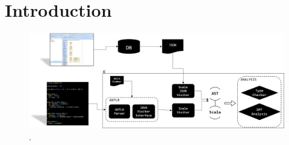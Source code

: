 \section{Introduction}

\begin{figure}
\centering
\includegraphics[scale=0.4]{K.png}
\caption{\Klang{}.}
\label{fig:spacecraftSmt}
\end{figure}

